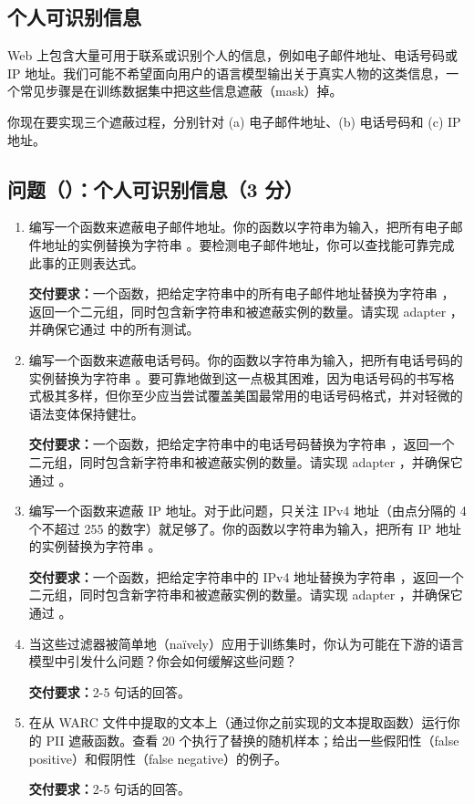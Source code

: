 \subsection{个人可识别信息}

Web 上包含大量可用于联系或识别个人的信息，例如电子邮件地址、电话号码或 IP 地址。我们可能不希望面向用户的语言模型输出关于真实人物的这类信息，一个常见步骤是在训练数据集中把这些信息遮蔽（mask）掉。

你现在要实现三个遮蔽过程，分别针对 (a) 电子邮件地址、(b) 电话号码和 (c) IP 地址。

\subsection*{问题（）：个人可识别信息（3 分）}

\begin{enumerate}[label=(\alph*)]
  \item 编写一个函数来遮蔽电子邮件地址。你的函数以字符串为输入，把所有电子邮件地址的实例替换为字符串 。要检测电子邮件地址，你可以查找能可靠完成此事的正则表达式。

  \textbf{交付要求：}一个函数，把给定字符串中的所有电子邮件地址替换为字符串 ，返回一个二元组，同时包含新字符串和被遮蔽实例的数量。请实现 adapter ，并确保它通过  中的所有测试。

  \item 编写一个函数来遮蔽电话号码。你的函数以字符串为输入，把所有电话号码的实例替换为字符串 。要可靠地做到这一点极其困难，因为电话号码的书写格式极其多样，但你至少应当尝试覆盖美国最常用的电话号码格式，并对轻微的语法变体保持健壮。

  \textbf{交付要求：}一个函数，把给定字符串中的电话号码替换为字符串 ，返回一个二元组，同时包含新字符串和被遮蔽实例的数量。请实现 adapter ，并确保它通过 。

  \item 编写一个函数来遮蔽 IP 地址。对于此问题，只关注 IPv4 地址（由点分隔的 4 个不超过 255 的数字）就足够了。你的函数以字符串为输入，把所有 IP 地址的实例替换为字符串 。

  \textbf{交付要求：}一个函数，把给定字符串中的 IPv4 地址替换为字符串 ，返回一个二元组，同时包含新字符串和被遮蔽实例的数量。请实现 adapter ，并确保它通过 。

  \item 当这些过滤器被简单地（naïvely）应用于训练集时，你认为可能在下游的语言模型中引发什么问题？你会如何缓解这些问题？

  \textbf{交付要求：}2-5 句话的回答。

  \item 在从 WARC 文件中提取的文本上（通过你之前实现的文本提取函数）运行你的 PII 遮蔽函数。查看 20 个执行了替换的随机样本；给出一些假阳性（false positive）和假阴性（false negative）的例子。

  \textbf{交付要求：}2-5 句话的回答。
\end{enumerate}

